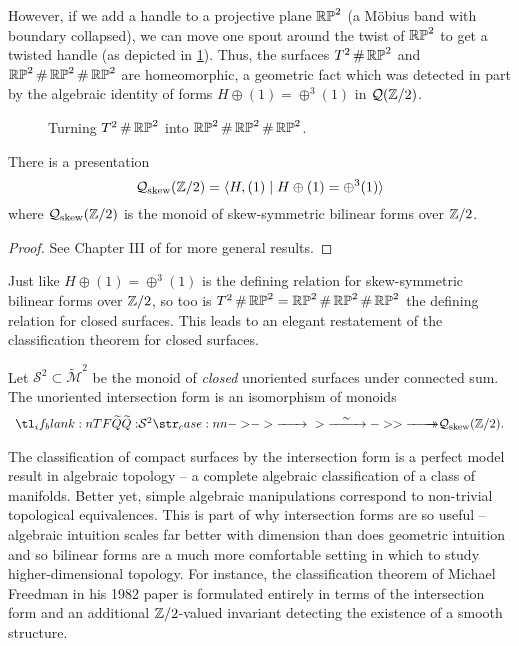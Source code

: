 However, if we add a handle to a projective plane $\mathbb{RP}^2$ (a M\"obius band with boundary collapsed), we can move one spout around the twist of $\mathbb{RP}^2$ to get a twisted handle (as depicted in \cref{fig:twisted-handle-to-handle}). Thus, the surfaces $T^2\,\#\,\mathbb{RP}^2$ and $\mathbb{RP}^2\,\#\,\mathbb{RP}^2\,\#\,\mathbb{RP}^2$ are homeomorphic, a geometric fact which was detected in part by the algebraic identity of forms $H\oplus (1)=\oplus^3(1)$ in $\mathcal{Q}(\mathbb{Z}/2)$.

\begin{figure}
	\centering
	\medskip
	\caption{Turning $T^2\,\#\,\mathbb{RP}^2$ into $\mathbb{RP}^2\,\#\,\mathbb{RP}^2\,\#\,\mathbb{RP}^2$.}\label{fig:twisted-handle-to-handle}
\end{figure}

\begin{proposition}
	There is a presentation
	\[\mathcal{Q}_{\mathrm{skew}}(\mathbb{Z}/2) = \langle H, (1) \mid H\oplus (1) = \oplus^3 (1)\rangle\]
	where $\mathcal{Q}_{\mathrm{skew}}(\mathbb{Z}/2)$ is the monoid of skew-symmetric bilinear forms over $\mathbb{Z}/2$.
\end{proposition}
\begin{proof}
	See Chapter III of \cite{milnorhuse1973forms} for more general results.
\end{proof}

Just like $H\oplus (1)= \oplus^3 (1)$ is the defining relation for skew-symmetric bilinear forms over $\mathbb{Z}/2$, so too is $T^2\,\#\, \mathbb{RP}^2 = \mathbb{RP}^2\,\#\,\mathbb{RP}^2\,\#\,\mathbb{RP}^2$ the defining relation for closed surfaces. This leads to an elegant restatement of the classification theorem for closed surfaces.

\begin{theorem}
	Let $\mathcal{S}^2\subset \widetilde{\mathcal{M}}^2$ be the monoid of \textit{closed} unoriented surfaces under connected sum. The unoriented intersection form is an isomorphism of monoids
	\[
		\lkxfunc{\widetilde{Q}}{\mathcal{S}^2}{\mathcal{Q}_{\mathrm{skew}}(\Z/2).}
	\]
\end{theorem}

The classification of compact surfaces by the intersection form is a perfect model result in algebraic topology -- a complete algebraic classification of a class of manifolds. Better yet, simple algebraic manipulations correspond to non-trivial topological equivalences. This is part of why intersection forms are so useful -- algebraic intuition scales far better with dimension than does geometric intuition and so bilinear forms are a much more comfortable setting in which to study higher-dimensional topology. For instance, the classification theorem of Michael Freedman in his 1982 paper \cite{freedman1982manifold} is formulated entirely in terms of the intersection form and an additional $\mathbb{Z}/2$-valued invariant detecting the existence of a smooth structure.

